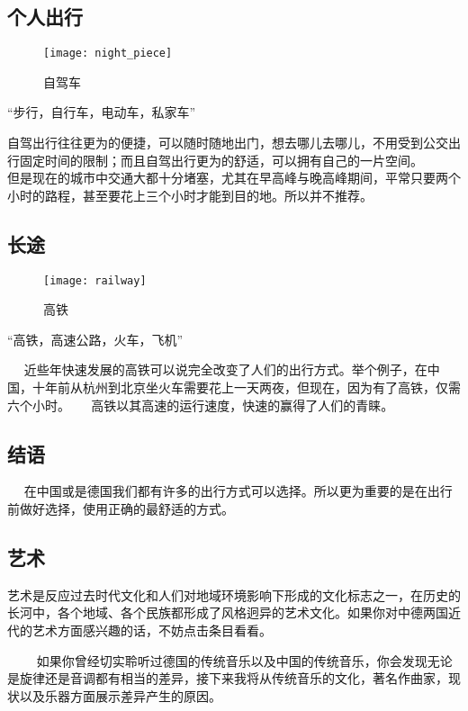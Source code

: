 \subsection{个人出行}

\begin{figure}[htb]
    \centering
    \texttt{[image: night\_piece]}
    \caption{自驾车}
\end{figure}

    “步行，自行车，电动车，私家车” 

    自驾出行往往更为的便捷，可以随时随地出门，想去哪儿去哪儿，不用受到公交出行固定时间的限制；而且自驾出行更为的舒适，可以拥有自己的一片空间。 
    
    但是现在的城市中交通大都十分堵塞，尤其在早高峰与晚高峰期间，平常只要两个小时的路程，甚至要花上三个小时才能到目的地。所以并不推荐。

\subsection{长途}
\begin{figure}[htb]
    \centering
    \texttt{[image: railway]}
    \caption{高铁}
\end{figure}

    “高铁，高速公路，火车，飞机” 

    近些年快速发展的高铁可以说完全改变了人们的出行方式。举个例子，在中国，十年前从杭州到北京坐火车需要花上一天两夜，但现在，因为有了高铁，仅需六个小时。 
    
    高铁以其高速的运行速度，快速的赢得了人们的青睐。

\subsection{结语}
    在中国或是德国我们都有许多的出行方式可以选择。所以更为重要的是在出行前做好选择，使用正确的最舒适的方式。



\subsection{艺术}
    艺术是反应过去时代文化和人们对地域环境影响下形成的文化标志之一，在历史的长河中，各个地域、各个民族都形成了风格迥异的艺术文化。如果你对中德两国近代的艺术方面感兴趣的话，不妨点击条目看看。

    如果你曾经切实聆听过德国的传统音乐以及中国的传统音乐，你会发现无论是旋律还是音调都有相当的差异，接下来我将从传统音乐的文化，著名作曲家，现状以及乐器方面展示差异产生的原因。

